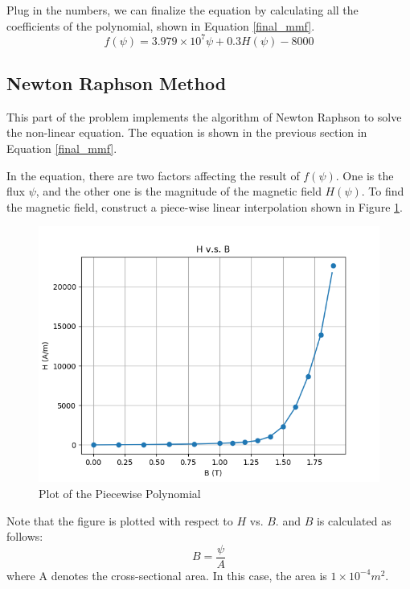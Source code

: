 \documentclass[a4paper,titlepage]{article}
\begin{document}
			Plug in the numbers, we can finalize the equation by calculating all the coefficients of the polynomial, shown in Equation \ref{final_mmf}.
			\begin{equation}
				f(\psi) = 3.979\times 10^{7}\psi + 0.3H(\psi) - 8000
				\label{final_mmf}
			\end{equation}
			
		\subsection{Newton Raphson Method}
			This part of the problem implements the algorithm of Newton Raphson to solve the non-linear equation. The equation is shown in the previous section in Equation \ref{final_mmf}. 
			
			In the equation, there are two factors affecting the result of $f(\psi)$. One is the flux $\psi$, and the other one is the magnitude of the magnetic field $H(\psi)$. To find the magnetic field, construct a piece-wise linear interpolation shown in Figure \ref{piecewise_poly}.
			\begin{figure}[!h]
				\centering
				\includegraphics[width=\linewidth]{../data/Piecewise_Polynomial}
				\caption{Plot of the Piecewise Polynomial}
				\label{piecewise_poly}
			\end{figure}
		
			Note that the figure is plotted with respect to $H$ vs. $B$. and $B$ is calculated as follows:
			\begin{equation}
				B = \frac{\psi}{A}
			\end{equation}
			where A denotes the cross-sectional area. In this case, the area is $1\times 10^{-4} m^2$.
			
\end{document}
